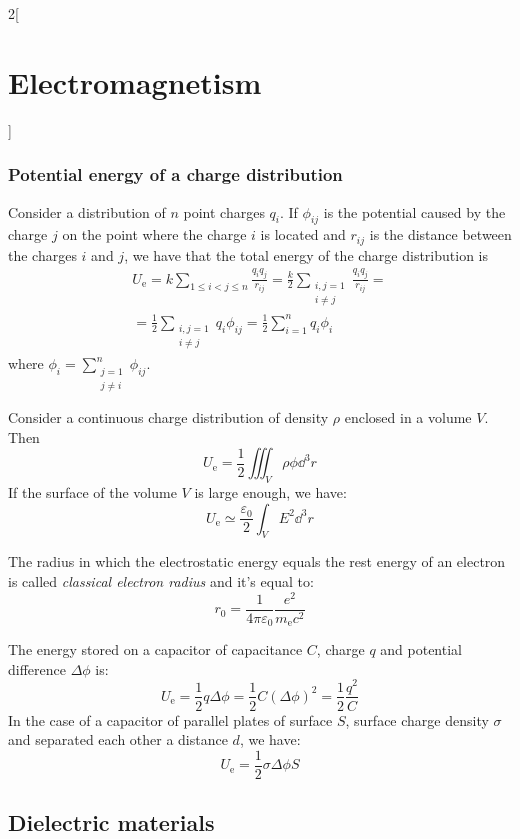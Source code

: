 \documentclass[../../../main.tex]{subfiles}
\begin{document}
\begin{multicols}{2}[\section{Electromagnetism}]
  \subsubsection{Potential energy of a charge distribution}
  \begin{proposition}
    Consider a distribution of $n$ point charges $q_i$. If $\phi_{ij}$ is the potential caused by the charge $j$ on the point where the charge $i$ is located and $r_{ij}$ is the distance between the charges $i$ and $j$, we have that the total energy of the charge distribution is
    \begin{multline*}
      U_\text{e}=k\sum_{1\leq i<j\leq n}\frac{q_iq_j}{r_{ij}}=\frac{k}{2}\sum_{\substack{i,j=1\\i\ne j}}\frac{q_iq_j}{r_{ij}}=\\
      =\frac{1}{2}\sum_{\substack{i,j=1\\i\ne j}}q_i\phi_{ij}=\frac{1}{2}\sum_{i=1}^nq_i\phi_i
    \end{multline*}
    where $\displaystyle\phi_i=\sum_{\substack{j=1\\j\ne i}}^n\phi_{ij}$.
  \end{proposition}
  \begin{proposition}
    Consider a continuous charge distribution of density $\rho$ enclosed in a volume $V$. Then $$U_\text{e}=\frac{1}{2}\iiint_V\rho\phi \dd^3r$$
    If the surface of the volume $V$ is large enough, we have: $$U_\text{e}\simeq\frac{\varepsilon_0}{2}\int_VE^2\dd^3r$$
  \end{proposition}
  \begin{definition}
    The radius in which the electrostatic energy equals the rest energy of an electron is called \emph{classical electron radius} and it's equal to: $$r_0=\frac{1}{4\pi\varepsilon_0}\frac{e^2}{m_\text{e}c^2}$$
  \end{definition}
  \begin{proposition}
    The energy stored on a capacitor of capacitance $C$, charge $q$ and potential difference $\Delta\phi$ is: $$U_\text{e}=\frac{1}{2}q\Delta \phi=\frac{1}{2}C{\left(\Delta\phi\right)}^2=\frac{1}{2}\frac{q^2}{C}$$ In the case of a capacitor of parallel plates of surface $S$, surface charge density $\sigma$ and separated each other a distance $d$, we have: $$U_\text{e}=\frac{1}{2}\sigma\Delta\phi S$$
  \end{proposition}
  \subsection{Dielectric materials}

\end{multicols}
\end{document}
